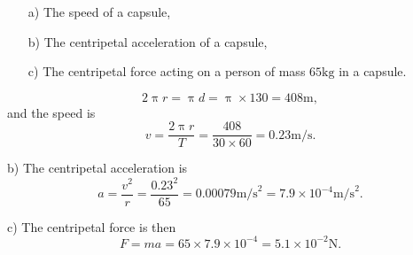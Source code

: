 \documentclass[a4paper,12pt]{book}
\begin{document}
\begin{itemize}
\setlength{\itemsep}{-5pt}
    \item[a)] The speed of a capsule,
    \item[b)] The centripetal acceleration of a capsule,
    \item[c)] The centripetal force acting on a person of mass $65\text{kg}$ in a capsule.
\end{itemize} 

\begin{equation*}
2\uppi r=\uppi d=\uppi \times 130=408\text{m},
\end{equation*}
and the speed is 
\begin{equation*}
v=\frac{2\uppi r}{T}=\frac{408}{30\times 60}=0.23\text{m/s}.
\end{equation*}

b) The centripetal acceleration is 
\begin{equation*}
a=\frac{v^{2}}{r}=\frac{0.23^{2}}{65}=0.00079\text{m/s}^{2}=7.9\times 10^{-4}\text{m/s}^{2}.
\end{equation*}

c) The centripetal force is then 
\begin{equation*}
F=ma=65\times 7.9\times 10^{-4}=5.1\times 10^{-2}\text{N}.
\end{equation*}

\end{document}
